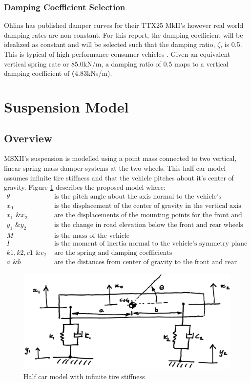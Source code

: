 \documentclass[12pt]{article}
\begin{document}
\subsubsection{Damping Coefficient Selection}
Ohlins has published damper curves for their TTX25 MkII's however real world damping rates are non constant. For this report, the damping coefficient will be idealized as constant and will be selected such that the damping ratio, $\zeta$, is 0.5. This is typical of high performance consumer vehicles \cite{dampers}. Given an equivalent vertical spring rate or 85.0kN/m, a damping ratio of 0.5 maps to a vertical damping coefficient of \textbf(4.83kNs/m). 

\section{Suspension Model}
\subsection{Overview}
MSXII's suspension is modelled using a point mass connected to two vertical, linear spring mass damper systems at the two wheels. This half car model assumes infinite tire stiffness and that the vehicle pitches about it's center of gravity. Figure \ref{fig:systemModel} describes the proposed model where: 
\begin{align*}
	\theta & \text{ is the pitch angle about the axis normal to the vehicle's symmetry plane}\\        
	x_0 & \text{ is the displacement of the center of gravity in the vertical axis} \\
	x_1 \text{ \& } x_2 & \text{ are the displacements of the mounting points for the front and rear wheels respectively} \\
	y_1 \text{ \& } y_2 & \text{ is the change in road elevation below the front  and rear wheels respectively} \\
	M & \text{ is the mass of the vehicle} \\
	I & \text{ is the moment of inertia normal to the vehicle’s symmetry plane at the center of gravity} \\
	k1,k2,c1 \text{ \& } c_2 & \text{ are the spring and damping coefficients} \\
	a \text{ \& } b & \text{ are the distances from center of gravity to the front and rear wheels respectively}
\end{align*}
\begin{figure}[h!]
	\centering
	\includegraphics[width=.8\textwidth]{./LaTex/systemModel.jpg}
	\caption{Half car model with infinite tire stiffness}
	\label{fig:systemModel}
\end{figure}
\end{document}
